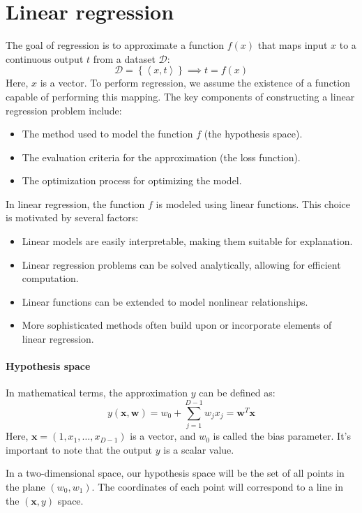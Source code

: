\section{Linear regression}

The goal of regression is to approximate a function $f(x)$ that maps input $x$ to a continuous output $t$ from a dataset $\mathcal{D}$: 
\[\mathcal{D}=\left\{ \left\langle x,t \right\rangle \right\} \implies t=f(x)\]
Here, $x$ is a vector. 
To perform regression, we assume the existence of a function capable of performing this mapping.
The key components of constructing a linear regression problem include:
\begin{itemize}
    \item The method used to model the function $f$ (the hypothesis space). 
    \item The evaluation criteria for the approximation (the loss function).
    \item The optimization process for optimizing the model.
\end{itemize}

In linear regression, the function $f$ is modeled using linear functions. 
This choice is motivated by several factors:
\begin{itemize}
    \item Linear models are easily interpretable, making them suitable for explanation.
    \item Linear regression problems can be solved analytically, allowing for efficient computation.
    \item Linear functions can be extended to model nonlinear relationships.
    \item More sophisticated methods often build upon or incorporate elements of linear regression.
\end{itemize}

\paragraph*{Hypothesis space}
In mathematical terms, the approximation $y$ can be defined as: 
\[y(\textbf{x},\textbf{w})=w_0+\sum_{j=1}^{D-1}w_j x_j=\textbf{w}^T\textbf{x}\]
Here, $\textbf{x} = \left( 1,x_1,\ldots,x_{D-1} \right)$ is a vector, and $w_0$ is called the bias parameter.
It's important to note that the output $y$ is a scalar value. 

In a two-dimensional space, our hypothesis space will be the set of all points in the plane $(w_0,w_1)$. 
The coordinates of each point will correspond to a line in the $\left( \textbf{x}, y \right)$ space.

